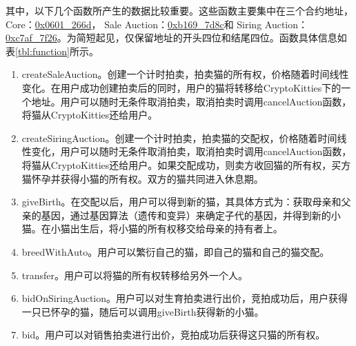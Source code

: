 \documentclass{myreport}
\begin{document}
其中，以下几个函数所产生的数据比较重要。这些函数主要集中在三个合约地址，Core：\href{https://etherscan.io/address/0x06012c8cf97bead5deae237070f9587f8e7a266d}{0x0601\_266d}， Sale Auction：\href{https://etherscan.io/address/0xb1690c08e213a35ed9bab7b318de14420fb57d8c}{0xb169\_7d8c}和 Siring Auction：\href{https://etherscan.io/address/0xc7af99fe5513eb6710e6d5f44f9989da40f27f26}{0xc7af\_7f26}。为简短起见，仅保留地址的开头四位和结尾四位。函数具体信息如表\ref{tbl:function}所示。
\begin{enumerate}
\item createSaleAuction。创建一个计时拍卖，拍卖猫的所有权，价格随着时间线性变化。在用户成功创建拍卖后的同时，用户的猫将转移给CryptoKitties下的一个地址。用户可以随时无条件取消拍卖，取消拍卖时调用cancelAuction函数，将猫从CryptoKitties还给用户。
\item createSiringAuction。创建一个计时拍卖，拍卖猫的交配权，价格随着时间线性变化，用户可以随时无条件取消拍卖，取消拍卖时调用cancelAuction函数，将猫从CryptoKitties还给用户。如果交配成功，则卖方收回猫的所有权，买方猫怀孕并获得小猫的所有权。双方的猫共同进入休息期。
\item giveBirth。在交配以后，用户可以得到新的猫，其具体方式为：获取母亲和父亲的基因，通过基因算法（遗传和变异）来确定子代的基因，并得到新的小猫。在小猫出生后，将小猫的所有权移交给母亲的持有者上。
\item breedWithAuto。用户可以繁衍自己的猫，即自己的猫和自己的猫交配。
\item transfer。用户可以将猫的所有权转移给另外一个人。

\item bidOnSiringAuction。用户可以对生育拍卖进行出价，竞拍成功后，用户获得一只已怀孕的猫，随后可以调用giveBirth获得新的小猫。
\item bid。用户可以对销售拍卖进行出价，竞拍成功后获得这只猫的所有权。
\end{enumerate}
\end{document}
